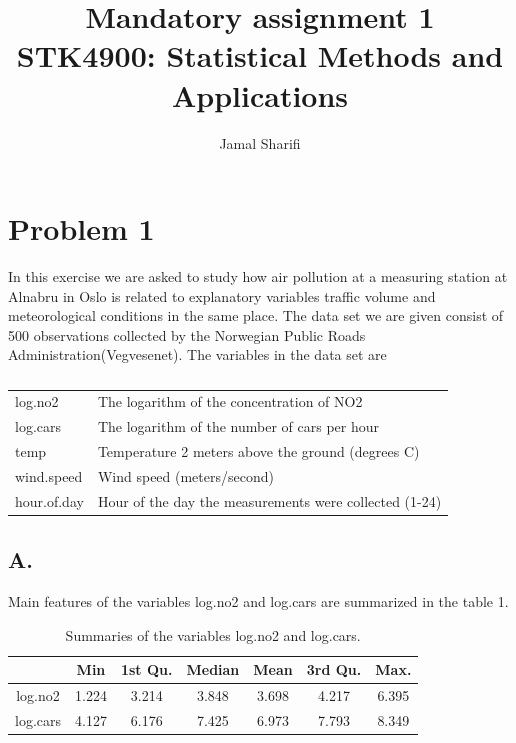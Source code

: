 \documentclass[a4paper,12pt]{article}
\title{{\sc Mandatory assignment 1 \\ {\large STK4900: Statistical Methods and Applications}}}
\author{Jamal Sharifi \\ }
\begin{document}
\linespread{1.5}
\renewcommand{\refname}{Referanser}
\renewcommand{\figurename}{Fig.} 

\onecolumn
\maketitle


\section*{Problem 1 }
In this exercise we are asked to study how air pollution at a measuring station at Alnabru in Oslo is related to explanatory variables traffic volume and meteorological conditions in the same place. The data set we are given consist of 500 observations collected by the Norwegian Public Roads Administration(Vegvesenet). The variables in the data set are

\begin{table}[H]
\caption*{} 
\centering
\begin{tabular}{l l} 
 log.no2 & The logarithm of the concentration of NO2  \\ [0.5ex] 
log.cars   & The logarithm of the number of cars per hour \\  
temp & Temperature 2 meters above the ground (degrees C) \\ 
wind.speed & Wind speed (meters/second) \\ 
hour.of.day & Hour of the day the measurements were collected (1-24) \\ [1ex] 
\end{tabular}
\end{table}

\subsection*{A. }
Main features of the variables log.no2 and log.cars are summarized in the table 1.

\begin{table}[H]
\caption{Summaries of the variables log.no2 and log.cars.} 
\centering
\begin{tabular}{c c c c c c c} 
\hline\hline 
 & Min & 1st Qu. & Median &  Mean  & 3rd Qu. &  Max.        \\ [0.5ex] 
\hline 
log.no2 & 1.224  & 3.214  & 3.848 &  3.698  & 4.217 &  6.395 \\  
log.cars & 4.127 &  6.176 &  7.425 &  6.973 &  7.793 & 8.349 \\ [1ex] 
\hline\hline
\end{tabular}
\end{table}
\end{document}

